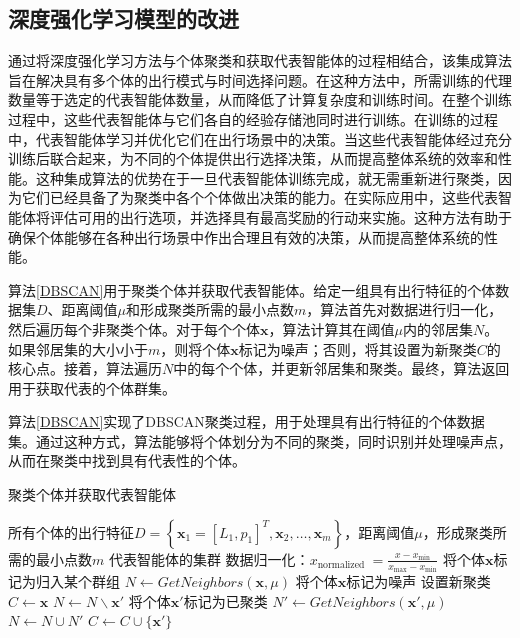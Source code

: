 \subsection{深度强化学习模型的改进}
通过将深度强化学习方法与个体聚类和获取代表智能体的过程相结合，该集成算法旨在解决具有多个体的出行模式与时间选择问题。在这种方法中，所需训练的代理数量等于选定的代表智能体数量，从而降低了计算复杂度和训练时间。在整个训练过程中，这些代表智能体与它们各自的经验存储池同时进行训练。在训练的过程中，代表智能体学习并优化它们在出行场景中的决策。当这些代表智能体经过充分训练后联合起来，为不同的个体提供出行选择决策，从而提高整体系统的效率和性能。这种集成算法的优势在于一旦代表智能体训练完成，就无需重新进行聚类，因为它们已经具备了为聚类中各个个体做出决策的能力。在实际应用中，这些代表智能体将评估可用的出行选项，并选择具有最高奖励的行动来实施。这种方法有助于确保个体能够在各种出行场景中作出合理且有效的决策，从而提高整体系统的性能。

算法\ref{DBSCAN}用于聚类个体并获取代表智能体。给定一组具有出行特征的个体数据集$D$、距离阈值$\mu$和形成聚类所需的最小点数$m$，算法首先对数据进行归一化，然后遍历每个非聚类个体。对于每个个体$\bm{x}$，算法计算其在阈值$\mu$内的邻居集$N$。如果邻居集的大小小于$m$，则将个体$\bm{x}$标记为噪声；否则，将其设置为新聚类$C$的核心点。接着，算法遍历$N$中的每个个体，并更新邻居集和聚类。最终，算法返回用于获取代表的个体群集。

算法\ref{DBSCAN}实现了DBSCAN聚类过程，用于处理具有出行特征的个体数据集。通过这种方式，算法能够将个体划分为不同的聚类，同时识别并处理噪声点，从而在聚类中找到具有代表性的个体。

\begin{algorithm}
\small
\caption{聚类个体并获取代表智能体}\label{DBSCAN}
\begin{algorithmic}
\Require   所有个体的出行特征$D=\left\{\bm{x}_{1}=[L_{1}, p_{1}]^T, \bm{x}_{2}, \ldots, \bm{x}_{m}\right\}$，距离阈值$\mu$，形成聚类所需的最小点数$m$
\Ensure 代表智能体的集群
\State 数据归一化：$x_{\text {normalized }}=\frac{x-x_{\min }}{x_{\max }-x_{\min }}$
    \State 将个体$\bm{x}$标记为归入某个群组
    \State $N \leftarrow GetNeighbors(\bm{x},\mu)$
        \State 将个体$\bm{x}$标记为噪声
    \Else
        \State 设置新聚类$C \leftarrow {\bm{x}}$
            \State $N \leftarrow N \backslash \bm{x'}$
                \State 将个体$\bm{x'}$标记为已聚类
                \State $N' \leftarrow GetNeighbors(\bm{x'},\mu)$
                    \State $N \leftarrow N \cup N'$
                \EndIf
                    \State $C \leftarrow C \cup \{ \bm{x'} \}$
                \EndIf
            \EndIf
        \EndFor
    \EndIf
\EndFor
\end{algorithmic}
\end{algorithm}

